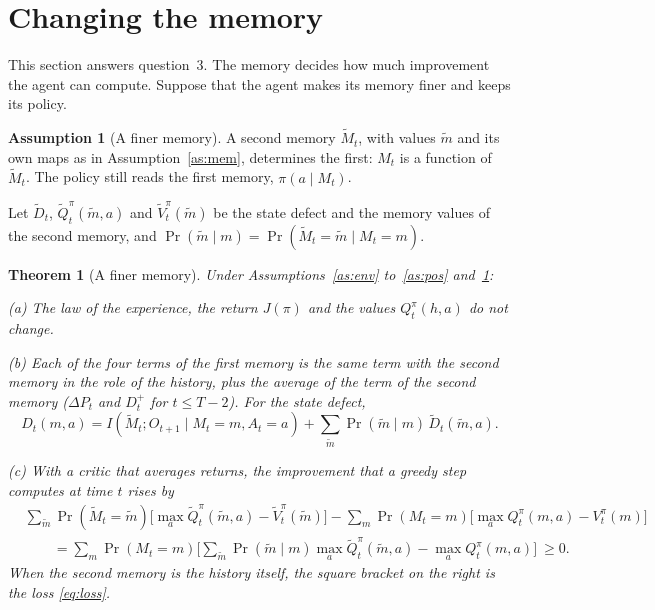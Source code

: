 \documentclass{article}
\newtheorem{theorem}{Theorem}
\theoremstyle{definition}
\newtheorem{assumption}{Assumption}
\newcommand{\dP}{\Delta P}
\begin{document}
\section{Changing the memory}\label{sec:mem}

This section answers question~3. The memory decides how much improvement the agent can compute. Suppose that the agent makes its memory finer and keeps its policy.
\begin{assumption}[A finer memory]\label{as:fine}
A second memory $\tilde M_t$, with values $\tilde m$ and its own maps as in Assumption~\ref{as:mem}, determines the first: $M_t$ is a function of $\tilde M_t$. The policy still reads the first memory, $\pi(a\mid M_t)$.
\end{assumption}
Let $\tilde D_t$, $\tilde Q^\pi_t(\tilde m,a)$ and $\tilde V^\pi_t(\tilde m)$ be the state defect and the memory values of the second memory, and $\Pr(\tilde m\mid m)=\Pr(\tilde M_t=\tilde m\mid M_t=m)$.

\begin{theorem}[A finer memory]\label{thm:fine}
Under Assumptions~\ref{as:env} to~\ref{as:pos} and~\ref{as:fine}:

(a) The law of the experience, the return $J(\pi)$ and the values $Q^\pi_t(h,a)$ do not change.

(b) Each of the four terms of the first memory is the same term with the second memory in the role of the history, plus the average of the term of the second memory ($\dP_t$ and $D^+_t$ for $t\le T-2$). For the state defect,
\[
D_t(m,a)=I(\tilde M_t;O_{t+1}\mid M_t=m,A_t=a)+\sum_{\tilde m}\Pr(\tilde m\mid m)\,\tilde D_t(\tilde m,a).
\]

(c) With a critic that averages returns, the improvement that a greedy step computes at time $t$ rises by
\begin{align*}
&\sum_{\tilde m}\Pr(\tilde M_t=\tilde m)\Big[\max_a\tilde Q^\pi_t(\tilde m,a)-\tilde V^\pi_t(\tilde m)\Big]-\sum_m\Pr(M_t=m)\Big[\max_aQ^\pi_t(m,a)-V^\pi_t(m)\Big]\\
&\qquad=\sum_m\Pr(M_t=m)\Big[\sum_{\tilde m}\Pr(\tilde m\mid m)\max_a\tilde Q^\pi_t(\tilde m,a)-\max_aQ^\pi_t(m,a)\Big]\ \ge0.
\end{align*}
When the second memory is the history itself, the square bracket on the right is the loss \eqref{eq:loss}.
\end{theorem}
\end{document}
